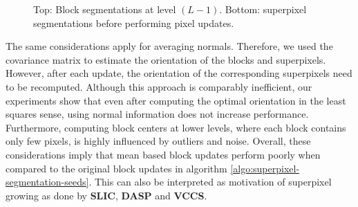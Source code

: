 \begin{figure}[t]
{	}
	\caption[An illustration of the disadvantages of using block centers to perform block updates.]{Top: Block segmentations at level $(L - 1)$. Bottom: superpixel segmentations before performing pixel updates.}
	\label{fig:seeds-depth-mean-block-updates-discussion-blocks}
\end{figure}
The same considerations apply for averaging normals. Therefore, we used the covariance matrix to estimate the orientation of the blocks and superpixels. However, after each update, the orientation of the corresponding superpixels need to be recomputed. Although this approach is comparably inefficient, our experiments show that even after computing the optimal orientation in the least squares sense, using normal information does not increase performance.
Furthermore, computing block centers at lower levels, where each block contains only few pixels, is highly influenced by outliers and noise. Overall, these considerations imply that mean based block updates perform poorly when compared to the original block updates in algorithm \ref{algo:superpixel-segmentation-seeds}. This can also be interpreted as motivation of superpixel growing as done by \textbf{SLIC}, \textbf{DASP} and \textbf{VCCS}.


